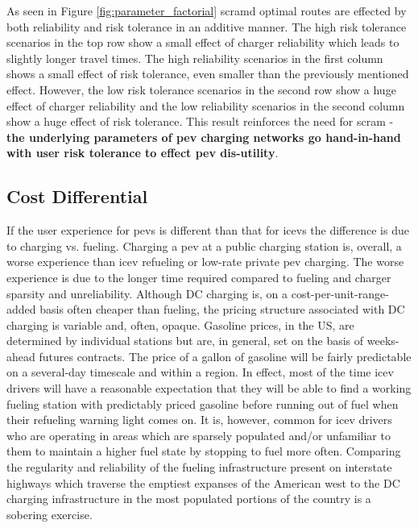 As seen in Figure \ref{fig:parameter_factorial} \gls{scramd} optimal routes are effected by both reliability and risk tolerance in an additive manner. The high risk tolerance scenarios in the top row show a small effect of charger reliability which leads to slightly longer travel times. The high reliability scenarios in the first column shows a small effect of risk tolerance, even smaller than the previously mentioned effect. However, the low risk tolerance scenarios in the second row show a huge effect of charger reliability and the low reliability scenarios in the second column show a huge effect of risk tolerance. This result reinforces the need for \gls{scram} - \textbf{the underlying parameters of \gls{pev} charging networks go hand-in-hand with user risk tolerance to effect \gls{pev} dis-utility}.

\subsection{Cost Differential}

If the user experience for \glspl{pev} is different than that for \glspl{icev} the difference is due to charging vs. fueling. Charging a \gls{pev} at a public charging station is, overall, a worse experience than \gls{icev} refueling or low-rate private \gls{pev} charging. The worse experience is due to the longer time required compared to fueling and charger sparsity and unreliability. Although DC charging is, on a cost-per-unit-range-added basis often cheaper than fueling, the pricing structure associated with DC charging is variable and, often, opaque. Gasoline prices, in the US, are determined by individual stations but are, in general, set on the basis of weeks-ahead futures contracts. The price of a gallon of gasoline will be fairly predictable on a several-day timescale and within a region. In effect, most of the time \gls{icev} drivers will have a reasonable expectation that they will be able to find a working fueling station with predictably priced gasoline before running out of fuel when their refueling warning light comes on. It is, however, common for \gls{icev} drivers who are operating in areas which are sparsely populated and/or unfamiliar to them to maintain a higher fuel state by stopping to fuel more often. Comparing the regularity and reliability of the fueling infrastructure present on interstate highways which traverse the emptiest expanses of the American west to the DC charging infrastructure in the most populated portions of the country is a sobering exercise.

